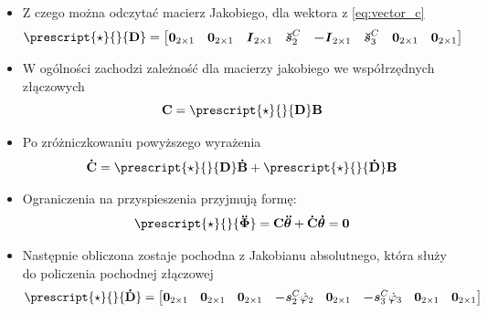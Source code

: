 \begin{itemize}
    \item Z czego można odczytać macierz Jakobiego, dla wektora z \ref{eq:vector_c}
        \begin{equation}
            \label{eq:absolute_jacobain}
                \prescript{\star}{}{\mathbf{D}}
                = 
                \begin{bmatrix}
                \boldsymbol{0}_{2\times1} &  \boldsymbol{0}_{2\times1} & \boldsymbol{I}_{2\times1} &  \boldsymbol{\breve s}_2^C & \boldsymbol{-I}_{2\times1} & \boldsymbol{\breve s}_3^C &  \boldsymbol{0}_{2\times1} &  \boldsymbol{0}_{2\times1}
                \end{bmatrix}
        \end{equation}
    \item W ogólności zachodzi zależność dla macierzy jakobiego we współrzędnych złączowych
        \begin{equation}
            \label{eq:C_matrix}
                \mathbf{C} =  \prescript{\star}{}{\mathbf{D}}\mathbf{B}
        \end{equation}
    \item Po zróżniczkowaniu powyższego wyrażenia
        \begin{equation}
            \label{eq:c_dot_matrix}
            \mathbf{\dot C}= \prescript{\star}{}{\mathbf{D}}\mathbf{\dot B} + \prescript{\star}{}{\mathbf{\dot D}}\mathbf{B}
        \end{equation}
    \item Ograniczenia na przyspieszenia przyjmują formę:
        \begin{equation}
        \label{eq:acceleration_constraint}
            \prescript{\star}{}{\boldsymbol{\ddot\Phi}} = \mathbf{C}\boldsymbol{\ddot \theta}+\mathbf{\dot C}\boldsymbol{\dot \theta} = \boldsymbol{0}
        \end{equation}
    \item Następnie obliczona zostaje pochodna z Jakobianu absolutnego, która służy do policzenia pochodnej złączowej
        \begin{equation}
            \label{eq:absolutne_jacobian_differentiated}
                \prescript{\star}{}{\mathbf{\dot D}}
                =
                \begin{bmatrix}
                \boldsymbol{0}_{2\times1} &  \boldsymbol{0}_{2\times1} & \boldsymbol{0}_{2\times1} &  \boldsymbol{- s}_2^C \dot\varphi_2 & \boldsymbol{0}_{2\times1} & \boldsymbol{- s}_3^C \dot\varphi_3 &  \boldsymbol{0}_{2\times1} &  \boldsymbol{0}_{2\times1}
                \end{bmatrix}

\end{equation}
\end{itemize}
